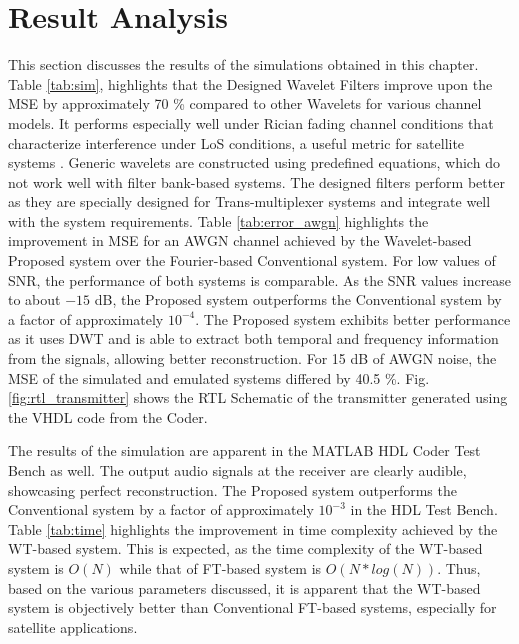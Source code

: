 \section{Result Analysis}
This section discusses the results of the simulations obtained in this chapter. Table \ref{tab:sim},  highlights that the Designed Wavelet Filters improve upon the MSE by approximately 70 \% compared to other Wavelets for various channel models. It performs especially well under Rician fading channel conditions that characterize interference under LoS conditions, a useful metric for satellite systems \cite{channel}. Generic wavelets are constructed using predefined equations, which do not work well with filter bank-based systems. The designed filters perform better as they are specially designed for Trans-multiplexer systems and integrate well with the system requirements. Table \ref{tab:error_awgn} highlights the improvement in MSE for an AWGN channel achieved by the Wavelet-based Proposed system over the Fourier-based Conventional system. For low values of SNR, the performance of both systems is comparable. As the SNR values increase to about $-15$ dB, the Proposed system outperforms the Conventional system by a factor of approximately $10^{-4}$. The Proposed system exhibits better performance as it uses DWT and is able to extract both temporal and frequency information from the signals, allowing better reconstruction. For 15 dB of AWGN noise, the MSE of the simulated and emulated systems differed by 40.5 \%. Fig. \ref{fig:rtl_transmitter} shows the RTL Schematic of the transmitter generated using the VHDL code from the Coder.

The results of the simulation are apparent in the MATLAB HDL Coder Test Bench as well. The output audio signals at the receiver are clearly audible, showcasing perfect reconstruction. The Proposed system outperforms the Conventional system by a factor of approximately $10^{-3}$ in the HDL Test Bench. Table \ref{tab:time} highlights the improvement in time complexity achieved by the WT-based system. This is expected, as the time complexity of the WT-based system is $O(N)$ while that of FT-based system is $O(N*log(N))$. Thus, based on the various parameters discussed, it is apparent that the WT-based system is objectively better than Conventional FT-based systems, especially for satellite applications.
